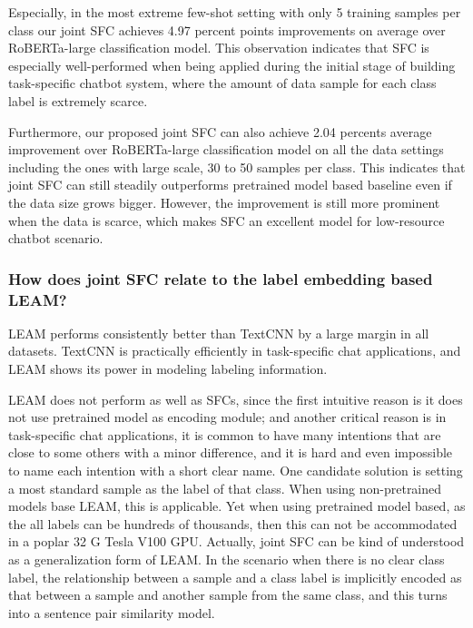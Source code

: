 \documentclass[letterpaper]{article} %
\begin{document}
  Especially,  in the most extreme few-shot setting with only 5 training samples
  per  class  our joint SFC achieves 4.97 percent points improvements on average
  over  RoBERTa-large classification model. This observation indicates that SFC
  is  especially  well-performed  when being applied during the initial stage of
  building  task-specific  chatbot  system,  where the amount of data sample for
  each class label is extremely scarce.

  Furthermore,  our  proposed  joint  SFC can also achieve 2.04 percents average
  improvement  over  RoBERTa-large classification model on all the data settings
  including  the  ones  with  large  scale,  30  to  50  samples per class. This
  indicates that joint SFC can still steadily outperforms pretrained model based
  baseline even if the data size grows bigger. However, the improvement is still
  more prominent when the data is scarce, which makes SFC an excellent model for
  low-resource chatbot scenario.

  \subsubsection*{How does joint SFC relate to the label  embedding based  LEAM?}
  LEAM performs consistently better than TextCNN by a large margin in all
  datasets. TextCNN is practically efficiently in task-specific chat
  applications, and LEAM shows its power in modeling labeling information.

  LEAM  does not perform as well as SFCs, since the first intuitive reason is it
  does  not use pretrained model as encoding module; and another critical reason
  is  in  task-specific  chat applications, it is common to have many intentions
  that are close to some others with a minor difference, and it is hard and even
  impossible  to  name  each  intention  with  a short clear name. One candidate
  solution  is  setting  a most standard sample as the label of that class. When
  using  non-pretrained  models  base  LEAM,  this is applicable. Yet when using
  pretrained  model  based, as the all labels can be hundreds of thousands, then
  this  can not be accommodated in a poplar 32 G Tesla V100 GPU. Actually, joint
  SFC  can  be  kind  of  understood  as  a  generalization form of LEAM. In the
  scenario when there is no clear class label, the relationship between a sample
  and  a class label is implicitly encoded as that between a sample and another
  sample  from  the  same  class, and this turns into a sentence pair similarity
  model.
\end{document}
